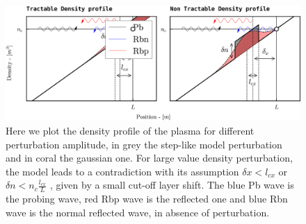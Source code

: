 \documentclass[11pt,a4paper,openany]{report}
\begin{document}
\begin{figure}[H]
    \centering
    \hspace{-1cm}\includegraphics[width = 1\linewidth]{./figures/density_profile.png}
    \caption{Here we plot the density profile of the plasma for different perturbation amplitude, in grey the step-like model perturbation and in coral the gaussian one. For large value density perturbation, the model leads to a contradiction with its assumption $\delta x < l_{cx}$ or $\delta n < n_c \frac{l_{cx}}{L}$ , given by a small cut-off layer shift. The blue Pb wave is the probing wave, red Rbp wave is the reflected one and blue Rbn wave is the normal reflected wave, in absence of perturbation.}
    \label{Density_profile}
\end{figure}
\end{document}

